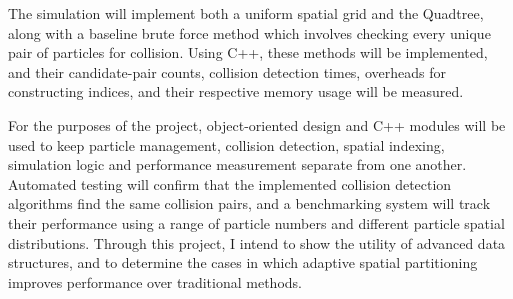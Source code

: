 The simulation will implement both a uniform spatial grid and the Quadtree, along with a
baseline brute force method which involves checking every unique pair of particles for collision. Using C++, these
methods will be implemented, and their candidate-pair counts, collision detection times,
overheads for constructing indices, and their respective memory usage will be measured.

For the purposes of the project, object-oriented design and C++ modules will be used to keep
particle management, collision detection, spatial indexing, simulation logic and performance
measurement separate from one another. Automated testing will confirm that the implemented
collision detection algorithms find the same collision pairs, and a benchmarking system will track their
performance using a range of particle numbers and different particle spatial distributions. Through this
project, I intend to show the utility of advanced data structures, and to determine the cases in which
adaptive spatial partitioning improves performance over traditional methods.
